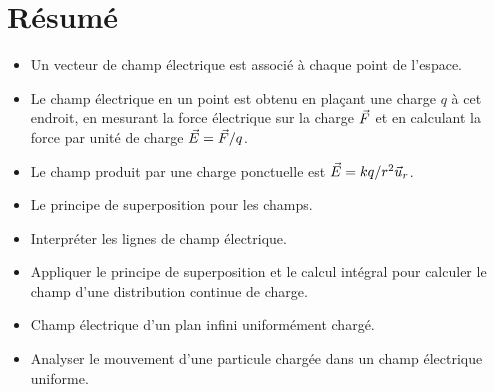 \section{Résumé}

\begin{itemize}
  \item Un vecteur de champ électrique est associé à chaque point de l'espace.
  \item Le champ électrique en un point est obtenu en plaçant une charge $q$ à
    cet endroit, en mesurant la force électrique sur la charge $\vec{F}$ et en
    calculant la force par unité de charge $\vec{E} = \vec{F} / q$.
  \item Le champ produit par une charge ponctuelle est $\vec{E} = kq / r^2 \vec{u}_r$.
  \item Le principe de superposition pour les champs.
  \item Interpréter les lignes de champ électrique.
  \item Appliquer le principe de superposition et le calcul intégral pour
    calculer le champ d'une distribution continue de charge.
  \item Champ électrique d'un plan infini uniformément chargé.
  \item Analyser le mouvement d'une particule chargée dans un champ électrique
    uniforme.
\end{itemize}
